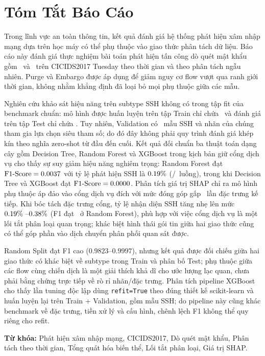 
\chapter*{Tóm Tắt Báo Cáo}

Trong lĩnh vực an toàn thông tin, kết quả đánh giá hệ thống phát hiện xâm nhập mạng dựa trên học máy có thể phụ thuộc vào giao thức phân tách dữ liệu. Báo cáo này đánh giá thực nghiệm bài toán phát hiện tấn công dò quét mật khẩu gồm \FTP\ và \SSH\ trên CICIDS2017 Tuesday theo thời gian và theo phân tách ngẫu nhiên. Purge và Embargo được áp dụng để giảm nguy cơ flow vượt qua ranh giới thời gian, không nhằm khẳng định đã loại bỏ mọi phụ thuộc giữa các mẫu.

Nghiên cứu khảo sát hiệu năng trên subtype SSH không có trong tập fit của benchmark chuẩn: mô hình được huấn luyện trên tập Train chỉ chứa \FTP\ và đánh giá trên tập Test chỉ chứa \SSH. Tuy nhiên, Validation có \DataValidationSSH\ mẫu SSH và nhãn của chúng tham gia lựa chọn siêu tham số; do đó đây không phải quy trình đánh giá khép kín theo nghĩa zero-shot từ đầu đến cuối. Kết quả đối chuẩn ba thuật toán dạng cây gồm Decision Tree, Random Forest và XGBoost trong kịch bản giữ cổng dịch vụ cho thấy sự suy giảm hiệu năng nghiêm trọng: Random Forest đạt $\text{F1-Score} = 0.0037$ với tỷ lệ phát hiện SSH là $0.19\%$ (\RFTestTP/\DataTestSSH\ luồng), trong khi Decision Tree và XGBoost đạt $\text{F1-Score} = 0.0000$. Phân tích giá trị SHAP chỉ ra mô hình phụ thuộc áp đảo vào cổng dịch vụ đích với mức đóng góp gấp \SHAPRatioTopOneTwo\ lần đặc trưng kế tiếp. Khi bóc tách đặc trưng cổng, tỷ lệ nhận diện SSH tăng nhẹ lên mức $0.19\%\ \text{--} 0.38\%$ (F1 đạt \RFTestWithoutPortFOne\ ở Random Forest), phù hợp với việc cổng dịch vụ là một lối tắt phân loại quan trọng; khác biệt hình thái gói tin giữa hai giao thức cũng có thể góp phần vào dịch chuyển phân phối quan sát được.

Random Split đạt F1 cao ($0.9823 \text{--} 0.9997$), nhưng kết quả được đối chiếu giữa hai giao thức có khác biệt về subtype trong Train và phân bố Test; phụ thuộc giữa các flow cùng chiến dịch là một giải thích khả dĩ cho ước lượng lạc quan, chưa phải bằng chứng trực tiếp về rò rỉ nhãn/đặc trưng. Phân tích pipeline XGBoost cho thấy lần tuning độc lập dùng \texttt{refit=True} theo đúng thiết kế scikit-learn và huấn luyện lại trên Train + Validation, gồm mẫu SSH; do pipeline này cũng khác benchmark về đặc trưng, tiền xử lý và cấu hình, chênh lệch F1 không thể quy riêng cho refit.

\vspace{0.3cm}
\noindent\textbf{Từ khóa:} Phát hiện xâm nhập mạng, CICIDS2017, Dò quét mật khẩu, Phân tách theo thời gian, Tổng quát hóa biến thể, Lối tắt phân loại, Giá trị SHAP.
